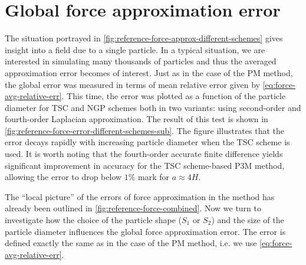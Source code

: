 \section{Global force approximation error}
The situation portrayed in \autoref{fig:reference-force-approx-different-schemes} gives insight into a field due to a single particle.
In a typical situation, we are interested in simulating many thousands of particles and thus the averaged approximation error becomes of interest.
Just as in the case of the PM method, the global error was measured in terms of mean relative error given by \autoref{eq:force-avg-relative-err}.
This time, the error was plotted as a function of the particle diameter for TSC and NGP schemes both in two variants: using second-order and fourth-order Laplacian approximation.
The result of this test is shown in \autoref{fig:reference-force-error-different-schemes-sub}.
The figure illustrates that the error decays rapidly with increasing particle diameter when the TSC scheme is used.
It is worth noting that the fourth-order accurate finite difference yields significant improvement in accuracy for the TSC scheme-based P3M method, allowing the error to drop below $1\%$ mark for $a \approx 4H$.

The ``local picture'' of the errors of force approximation in the \PThreeM{} method has already been outlined in \autoref{fig:reference-force-combined}.
Now we turn to investigate how the choice of the particle shape ($S_1$ or $S_2$) and the size of the particle diameter influences the global force approximation error.
The error is defined exactly the same as in the case of the PM method, i.e. we use \autoref{eq:force-avg-relative-err}.

